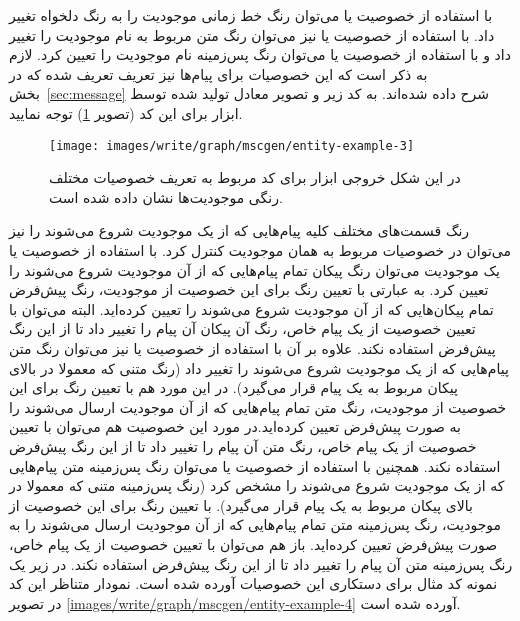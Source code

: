 با استفاده از خصوصیت  یا  می‌توان رنگ خط زمانی
موجودیت را به رنگ دلخواه تغییر داد. با استفاده از خصوصیت  یا
 نیز می‌توان رنگ متن مربوط به نام موجودیت را تغییر داد و
با استفاده از خصوصیت  یا  می‌توان رنگ پس‌زمینه
نام موجودیت را تعیین کرد. لازم به ذکر است که این خصوصیات برای پیام‌ها نیز تعریف
تعریف شده که در بخش~\ref{sec:message} شرح داده شده‌اند. به کد زیر و تصویر معادل
تولید شده توسط ابزار  برای این کد (تصویر \ref{images/write/graph/mscgen/entity-example-3}) توجه نمایید.


\begin{figure}[h]
	\centering
	\texttt{[image: images/write/graph/mscgen/entity-example-3]}
	\caption[مثالی از نحوه تعریف خصوصیات مختلف موجودیت‌ها]
	{در این شکل خروجی ابزار  برای کد مربوط به تعریف خصوصیات
	مختلف رنگی موجودیت‌ها نشان داده شده است.}
	\label{images/write/graph/mscgen/entity-example-3}
\end{figure}
 
رنگ قسمت‌های مختلف کلیه پیام‌هایی که از یک موجودیت شروع می‌شوند را نیز می‌توان
در خصوصیات مربوط به همان موجودیت کنترل کرد. با استفاده از خصوصیت
 یا  یک موجودیت می‌توان رنگ پیکان تمام
پیام‌هایی که از آن موجودیت شروع می‌شوند را تعیین کرد. به عبارتی با تعیین رنگ
برای این خصوصیت از موجودیت، رنگ پیش‌فرض تمام پیکان‌هایی که از آن موجودیت شروع
می‌شوند را تعیین کرده‌اید. البته می‌توان با تعیین خصوصیت  از یک
پیام خاص، رنگ آن پیکان آن پیام را تغییر داد تا از این رنگ پیش‌فرض استفاده نکند.
علاوه بر آن با استفاده از خصوصیت  یا  نیز
می‌توان رنگ متن پیام‌هایی که از یک موجودیت شروع می‌شوند را تغییر داد (رنگ متنی
که معمولا در بالای پیکان مربوط به یک پیام قرار می‌گیرد). در این مورد هم با تعیین
رنگ برای این خصوصیت از موجودیت، رنگ متن تمام پیام‌هایی که از آن موجودیت ارسال
می‌شوند را به صورت پیش‌فرض تعیین کرده‌اید.در مورد این خصوصیت هم می‌توان با تعیین
خصوصیت  از یک پیام خاص، رنگ متن آن پیام را تغییر داد تا از این رنگ
پیش‌فرض استفاده نکند. همچنین با استفاده از خصوصیت  یا  می‌توان رنگ
پس‌زمینه متن پیام‌هایی که از یک موجودیت شروع می‌شوند را مشخص کرد (رنگ پس‌زمینه
متنی که معمولا در بالای پیکان مربوط به یک پیام قرار می‌گیرد). با تعیین
رنگ برای این خصوصیت از موجودیت، رنگ پس‌زمینه متن تمام پیام‌هایی که از آن موجودیت ارسال می‌شوند را به
صورت پیش‌فرض تعیین کرده‌اید. باز هم می‌توان با تعیین خصوصیت  از
یک پیام خاص، رنگ پس‌زمینه متن آن پیام را تغییر داد تا از این رنگ پیش‌فرض استفاده
نکند. در زیر یک نمونه کد مثال برای دستکاری این خصوصیات آورده شده است. نمودار
متناظر این کد در تصویر \ref{images/write/graph/mscgen/entity-example-4} آورده
شده است.

